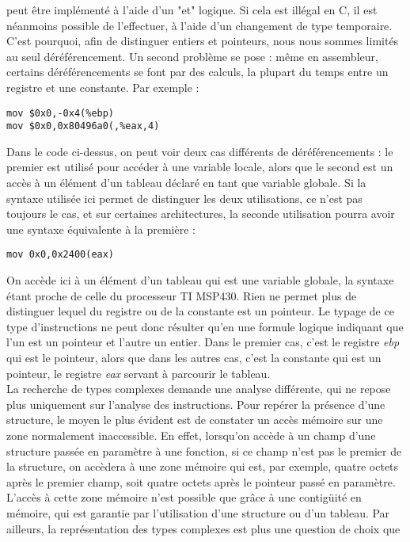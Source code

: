 \documentclass[a4paper,12pt]{article}
\begin{document}
peut être implémenté à l'aide d'un "et" logique. Si cela est illégal en C,
il est néanmoins possible de l'effectuer, à l'aide d'un changement de type
temporaire. C'est pourquoi, afin de distinguer entiers et pointeurs, nous
nous sommes limités au seul déréférencement. Un second problème se pose :
même en assembleur, certains déréférencements se font par des calculs,
la plupart du temps entre un registre et une constante. Par exemple :
\begin{lstlisting}[style=customasm]
mov $0x0,-0x4(%ebp)
mov $0x0,0x80496a0(,%eax,4)
\end{lstlisting}
Dans le code ci-dessus, on peut voir deux cas différents de 
déréférencements : le premier est utilisé pour accéder à une variable
locale, alors que le second est un accès à un élément d'un tableau 
déclaré en tant que variable globale. Si la syntaxe utilisée ici
permet de distinguer les deux utilisations, ce n'est pas toujours le cas,
et sur certaines architectures, la seconde utilisation pourra avoir une
syntaxe équivalente à la première :
\begin{lstlisting}[style=customasm]
mov 0x0,0x2400(eax)
\end{lstlisting}
On accède ici à un élément d'un tableau qui est une variable globale, la
syntaxe étant proche de celle du processeur TI MSP430. Rien ne permet plus
de distinguer lequel du registre ou de la constante est un pointeur. Le
typage de ce type d'instructions ne peut donc résulter qu'en une formule
logique indiquant que l'un est un pointeur et l'autre un entier. Dans le
premier cas, c'est le registre \textit{ebp} qui est le pointeur, alors que
dans les autres cas, c'est la constante qui est un pointeur, le registre
\textit{eax} servant à parcourir le tableau. \\
La recherche de types complexes demande une analyse différente, qui ne repose
plus uniquement sur l'analyse des instructions. Pour repérer la présence
d'une structure, le moyen le plus évident est de constater un accès mémoire
sur une zone normalement inaccessible. En effet, lorsqu'on accède à un
champ d'une structure passée en paramètre à une fonction, si ce champ n'est
pas le premier de la structure, on accèdera à une zone mémoire qui est,
par exemple, quatre octets après le premier champ, soit quatre octets après
le pointeur passé en paramètre. L'accès à cette zone mémoire n'est 
possible que grâce à une contigüité en mémoire, qui est garantie par
l'utilisation d'une structure ou d'un tableau. Par ailleurs, la
représentation des types complexes est plus une question de choix que
\end{document}
